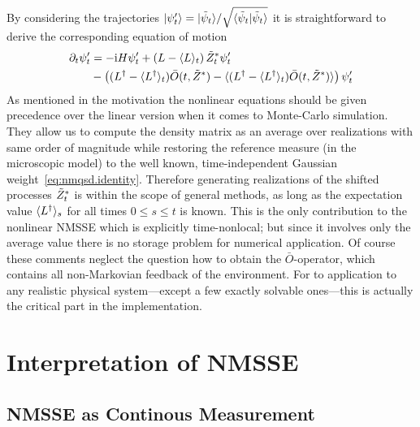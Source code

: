 By considering the trajectories $| \psi'_t \rangle = | \tilde\psi_t \rangle / \sqrt{\langle \tilde\psi_t | \tilde\psi_t \rangle}$ it is straightforward to derive the corresponding equation of motion \cite{???}
\begin{align}
  \partial_t\psi'_t &= -\mathrm{i}H\psi'_t  +  \left(L - \langle L \rangle_t\right) {\tilde Z}^*_t\psi'_t  \nonumber \\
  &-  \left( (L^\dagger - \langle L^\dagger \rangle_t) \bar O(t, {\tilde Z}^*) - \langle (L^\dagger - \langle L^\dagger \rangle_t) \bar O(t, {\tilde Z}^*) \rangle \right) \psi'_t
  \label{eq:nmqsd.nmsse_nonlin_full}
\end{align}
As mentioned in the motivation the nonlinear equations should be given precedence over the linear version when it comes to Monte-Carlo simulation.
They allow us to compute the density matrix as an average over realizations with same order of magnitude while restoring the reference measure (in the microscopic model) to the well known, time-independent Gaussian weight~\ref{eq:nmqsd.identity}.
Therefore generating realizations of the shifted processes ${\tilde Z}^*_t$ is within the scope of general methods, as long as the expectation value $\langle L^\dagger \rangle_s$ for all times $0 \le s \le t$ is known.
This is the only contribution to the nonlinear NMSSE which is explicitly time-nonlocal;
but since it involves only the average value there is no storage problem for numerical application.
Of course these comments neglect the question how to obtain the $\bar O$-operator, which contains all non-Markovian feedback of the environment.
For to application to any realistic physical system---except a few exactly solvable ones---this is actually the critical part in the implementation.


\section{Interpretation of NMSSE}
\label{sec:nmqsd.interpretation}


\subsection{NMSSE as Continous Measurement}
\label{sub:nmqsd.interpretation.measurement}

